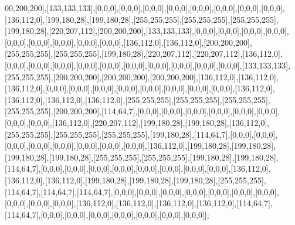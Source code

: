 00,200,200],[133,133,133],[0,0,0],[0,0,0],[0,0,0],[0,0,0],[0,0,0],[0,0,0],[0,0,0],[0,0,0],[136,112,0],[199,180,28],[199,180,28],[255,255,255],[255,255,255],[255,255,255],[199,180,28],[220,207,112],[200,200,200],[133,133,133],[0,0,0],[0,0,0],[0,0,0],[0,0,0],[0,0,0],[0,0,0],[0,0,0],[0,0,0],[0,0,0],[136,112,0],[136,112,0],[200,200,200],[255,255,255],[255,255,255],[199,180,28],[220,207,112],[220,207,112],[136,112,0],[0,0,0],[0,0,0],[0,0,0],[0,0,0],[0,0,0],[0,0,0],[0,0,0],[0,0,0],[0,0,0],[0,0,0],[133,133,133],[255,255,255],[200,200,200],[200,200,200],[200,200,200],[136,112,0],[136,112,0],[136,112,0],[0,0,0],[0,0,0],[0,0,0],[0,0,0],[0,0,0],[0,0,0],[0,0,0],[0,0,0],[136,112,0],[136,112,0],[136,112,0],[136,112,0],[255,255,255],[255,255,255],[255,255,255],[255,255,255],[200,200,200],[114,64,7],[0,0,0],[0,0,0],[0,0,0],[0,0,0],[0,0,0],[0,0,0],[0,0,0],[0,0,0],[136,112,0],[220,207,112],[199,180,28],[199,180,28],[136,112,0],[255,255,255],[255,255,255],[255,255,255],[199,180,28],[114,64,7],[0,0,0],[0,0,0],[0,0,0],[0,0,0],[0,0,0],[0,0,0],[0,0,0],[0,0,0],[136,112,0],[199,180,28],[199,180,28],[199,180,28],[199,180,28],[255,255,255],[255,255,255],[199,180,28],[199,180,28],[114,64,7],[0,0,0],[0,0,0],[0,0,0],[0,0,0],[0,0,0],[0,0,0],[0,0,0],[0,0,0],[136,112,0],[136,112,0],[136,112,0],[199,180,28],[199,180,28],[199,180,28],[255,255,255],[114,64,7],[114,64,7],[114,64,7],[0,0,0],[0,0,0],[0,0,0],[0,0,0],[0,0,0],[0,0,0],[0,0,0],[0,0,0],[0,0,0],[0,0,0],[136,112,0],[136,112,0],[136,112,0],[136,112,0],[114,64,7],[114,64,7],[0,0,0],[0,0,0],[0,0,0],[0,0,0],[0,0,0],[0,0,0],[0,0,0]];

